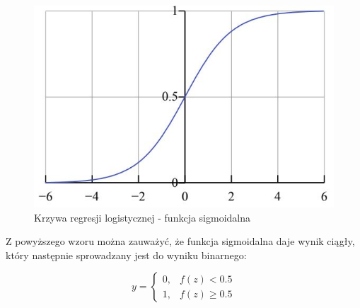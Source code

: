 \begin{figure}[h] 
        \centering\includegraphics[width=15cm]{figures/sigmoidFunc.JPG}
        \caption{Krzywa regresji logistycznej - funkcja sigmoidalna \cite{MGrzyb}}
\end{figure}

\newpage
Z powyższego wzoru można zauważyć, że funkcja sigmoidalna daje wynik ciągły, który następnie sprowadzany jest do wyniku binarnego:

\[
y = 
    \begin{cases}
            0,& f(z) < 0.5\\
            1,& f(z) \ge 0.5
    \end{cases}
\]

\newpage
